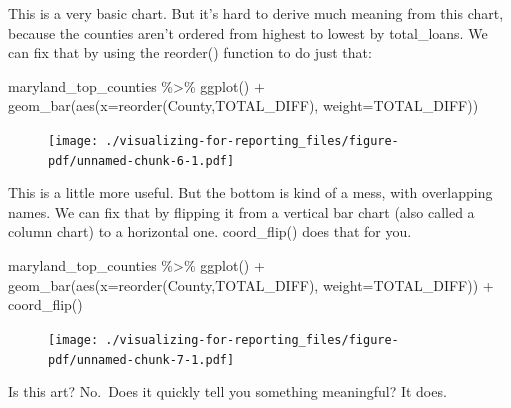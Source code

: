 \documentclass[
  letterpaper,
  DIV=11,
  numbers=noendperiod]{scrreprt}
\newenvironment{Shaded}{\begin{snugshade}}{\end{snugshade}}
\newcommand{\AttributeTok}[1]{\textcolor[rgb]{0.40,0.45,0.13}{#1}}
\newcommand{\FunctionTok}[1]{\textcolor[rgb]{0.28,0.35,0.67}{#1}}
\newcommand{\NormalTok}[1]{\textcolor[rgb]{0.00,0.23,0.31}{#1}}
\newcommand{\SpecialCharTok}[1]{\textcolor[rgb]{0.37,0.37,0.37}{#1}}
\begin{document}
This is a very basic chart. But it's hard to derive much meaning from
this chart, because the counties aren't ordered from highest to lowest
by total\_loans. We can fix that by using the reorder() function to do
just that:

\begin{Shaded}
\begin{Highlighting}[]
\NormalTok{maryland\_top\_counties }\SpecialCharTok{\%\textgreater{}\%}
  \FunctionTok{ggplot}\NormalTok{() }\SpecialCharTok{+}
  \FunctionTok{geom\_bar}\NormalTok{(}\FunctionTok{aes}\NormalTok{(}\AttributeTok{x=}\FunctionTok{reorder}\NormalTok{(County,TOTAL\_DIFF), }\AttributeTok{weight=}\NormalTok{TOTAL\_DIFF))}
\end{Highlighting}
\end{Shaded}

\begin{figure}[H]

{\centering \texttt{[image: ./visualizing-for-reporting\_files/figure-pdf/unnamed-chunk-6-1.pdf]}

}

\end{figure}

This is a little more useful. But the bottom is kind of a mess, with
overlapping names. We can fix that by flipping it from a vertical bar
chart (also called a column chart) to a horizontal one. coord\_flip()
does that for you.

\begin{Shaded}
\begin{Highlighting}[]
\NormalTok{maryland\_top\_counties }\SpecialCharTok{\%\textgreater{}\%}
  \FunctionTok{ggplot}\NormalTok{() }\SpecialCharTok{+}
  \FunctionTok{geom\_bar}\NormalTok{(}\FunctionTok{aes}\NormalTok{(}\AttributeTok{x=}\FunctionTok{reorder}\NormalTok{(County,TOTAL\_DIFF), }\AttributeTok{weight=}\NormalTok{TOTAL\_DIFF)) }\SpecialCharTok{+}
  \FunctionTok{coord\_flip}\NormalTok{()}
\end{Highlighting}
\end{Shaded}

\begin{figure}[H]

{\centering \texttt{[image: ./visualizing-for-reporting\_files/figure-pdf/unnamed-chunk-7-1.pdf]}

}

\end{figure}

Is this art? No.~Does it quickly tell you something meaningful? It does.
\end{document}
